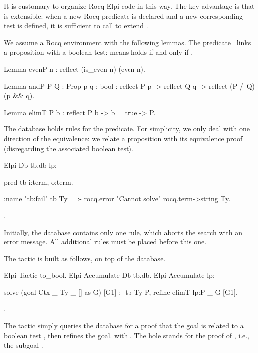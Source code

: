 \documentclass{these-ISSS}
\newenvironment{rocqcode}
  {\VerbatimEnvironment\begin{rocqbox}\begin{xrocqcode}}{\end{xrocqcode}
\end{rocqbox}}
\begin{document}
It is customary to organize Rocq-Elpi code in this way. The key advantage is that
 is extensible: when a new Rocq predicate is declared and a new
corresponding test is defined, it is sufficient to call
 to extend .



We assume a Rocq environment with the following lemmas. The 
predicate~\cite{assia_mahboubi_2022_7118596} links a proposition with a boolean test:  means
 holds if and only if .

\begin{rocqcode}
Lemma evenP n : reflect (is_even n) (even n).

Lemma andP  {P Q : Prop} {p q : bool} :
  reflect P p -> reflect Q q -> reflect (P /\ Q) (p && q).

Lemma elimT {P b} :
  reflect P b -> b = true -> P.
\end{rocqcode}



The database holds rules for the  predicate. For simplicity, we only
deal with one direction of the equivalence: we relate a proposition with its
equivalence proof (disregarding the associated boolean test).

\begin{rocqcode}
Elpi Db tb.db lp:{{

pred tb i:term, o:term.

:name "tb:fail"
tb Ty _ :- rocq.error "Cannot solve" {rocq.term->string Ty}.

}}.
\end{rocqcode}


Initially, the database contains only one rule, which aborts the search with
an error message. All additional rules must be placed before this one.


The  tactic is built as follows, on top of the database.

\begin{rocqcode}
Elpi Tactic to_bool.
Elpi Accumulate Db tb.db.
Elpi Accumulate lp:{{

solve (goal Ctx _ Ty _ [] as G) [G1] :-
  tb Ty P,
  refine {{ elimT lp:P _ }} G [G1].

}}.
\end{rocqcode}


The tactic simply queries the database for a proof  that the goal is
related to a boolean test , then refines the goal.
with . The hole stands for the proof
of , i.e., the subgoal .
\end{document}
